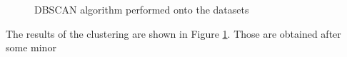   \begin{figure}[H]
    \centering
    \qquad
    \qquad
    \caption{DBSCAN algorithm performed onto the datasets}
    \label{dbscan_nospectral}
  \end{figure}

  The results of the clustering are shown in Figure \ref{dbscan_nospectral}. Those are obtained after some minor 
